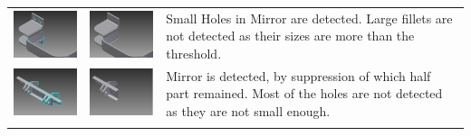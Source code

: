\begin{longtable}{ C{0.28\textwidth}  C{0.28\textwidth}  L{0.4\textwidth}}
\includegraphics[scale=.72]{..//Common/images//defeatmodel2.png} &
\includegraphics[scale=.72]{..//Common/images//defeatresult2.png} &
Small Holes in Mirror are detected. Large fillets are not detected as their sizes are more than the threshold. \\


\includegraphics[scale=.72]{..//Common/images//defeatmodel3.png} &
\includegraphics[scale=.72]{..//Common/images//defeatresult3.png} &
Mirror is detected, by suppression of which half part remained. Most of the holes are not detected as they are not small enough. \\
\hline
\label{Defeat}
\end{longtable}



